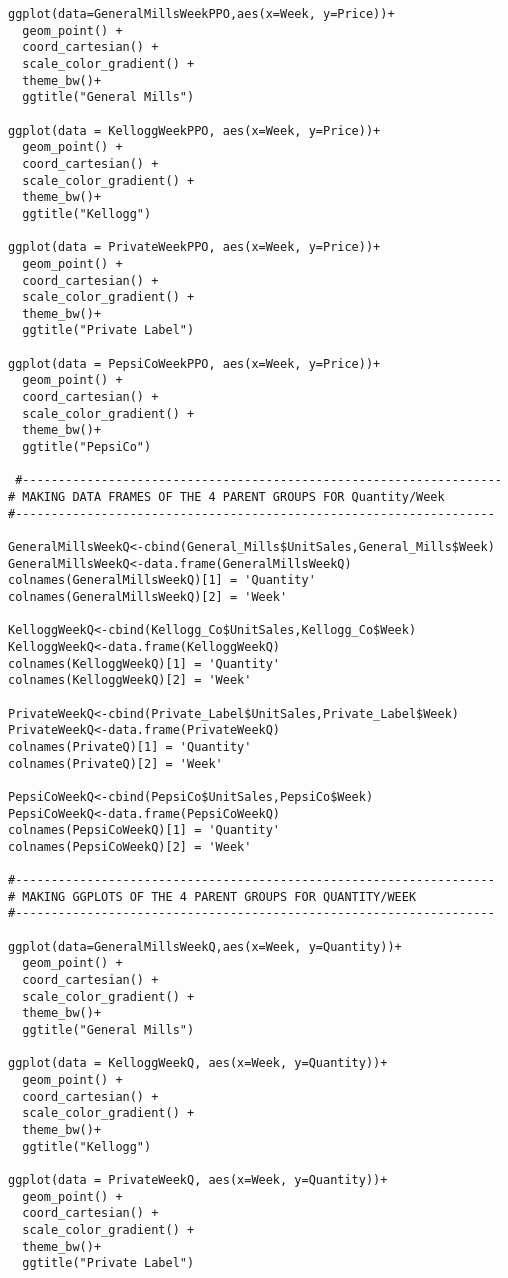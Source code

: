 \documentclass[12pt,english]{article}
\begin{document}
\begin{lstlisting}
ggplot(data=GeneralMillsWeekPPO,aes(x=Week, y=Price))+
  geom_point() +
  coord_cartesian() +
  scale_color_gradient() +
  theme_bw()+
  ggtitle("General Mills")

ggplot(data = KelloggWeekPPO, aes(x=Week, y=Price))+
  geom_point() +
  coord_cartesian() +
  scale_color_gradient() +
  theme_bw()+
  ggtitle("Kellogg")

ggplot(data = PrivateWeekPPO, aes(x=Week, y=Price))+
  geom_point() +
  coord_cartesian() +
  scale_color_gradient() +
  theme_bw()+
  ggtitle("Private Label")

ggplot(data = PepsiCoWeekPPO, aes(x=Week, y=Price))+
  geom_point() +
  coord_cartesian() +
  scale_color_gradient() +
  theme_bw()+
  ggtitle("PepsiCo")
  
 #-------------------------------------------------------------------
# MAKING DATA FRAMES OF THE 4 PARENT GROUPS FOR Quantity/Week
#-------------------------------------------------------------------

GeneralMillsWeekQ<-cbind(General_Mills$UnitSales,General_Mills$Week)
GeneralMillsWeekQ<-data.frame(GeneralMillsWeekQ)
colnames(GeneralMillsWeekQ)[1] = 'Quantity'
colnames(GeneralMillsWeekQ)[2] = 'Week'

KelloggWeekQ<-cbind(Kellogg_Co$UnitSales,Kellogg_Co$Week)
KelloggWeekQ<-data.frame(KelloggWeekQ)
colnames(KelloggWeekQ)[1] = 'Quantity'
colnames(KelloggWeekQ)[2] = 'Week'

PrivateWeekQ<-cbind(Private_Label$UnitSales,Private_Label$Week)
PrivateWeekQ<-data.frame(PrivateWeekQ)
colnames(PrivateQ)[1] = 'Quantity'
colnames(PrivateQ)[2] = 'Week'

PepsiCoWeekQ<-cbind(PepsiCo$UnitSales,PepsiCo$Week)
PepsiCoWeekQ<-data.frame(PepsiCoWeekQ)
colnames(PepsiCoWeekQ)[1] = 'Quantity'
colnames(PepsiCoWeekQ)[2] = 'Week'

#-------------------------------------------------------------------
# MAKING GGPLOTS OF THE 4 PARENT GROUPS FOR QUANTITY/WEEK
#-------------------------------------------------------------------

ggplot(data=GeneralMillsWeekQ,aes(x=Week, y=Quantity))+
  geom_point() +
  coord_cartesian() +
  scale_color_gradient() +
  theme_bw()+
  ggtitle("General Mills")

ggplot(data = KelloggWeekQ, aes(x=Week, y=Quantity))+
  geom_point() +
  coord_cartesian() +
  scale_color_gradient() +
  theme_bw()+
  ggtitle("Kellogg")

ggplot(data = PrivateWeekQ, aes(x=Week, y=Quantity))+
  geom_point() +
  coord_cartesian() +
  scale_color_gradient() +
  theme_bw()+
  ggtitle("Private Label")


\end{lstlisting}
\end{document}
